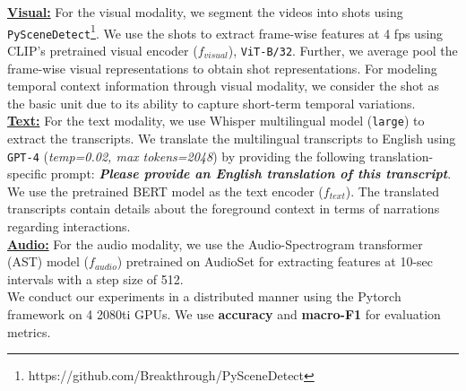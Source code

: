 \textbf{\underline{Visual:}} For the visual modality, we segment the videos into shots using \texttt{PySceneDetect}\footnote{https://github.com/Breakthrough/PySceneDetect}. We use the shots to extract frame-wise features at 4 fps using CLIP's \cite{Radford2021LearningTV} pretrained visual encoder ($f_{visual}$), \texttt{ViT-B/32}. Further, we average pool the frame-wise visual representations to obtain shot representations. For modeling temporal context information through visual modality, we consider the shot as the basic unit due to its ability to capture short-term temporal variations. \\
 \textbf{\underline{Text:}} For the text modality, we use Whisper \cite{Radford2022RobustSR} multilingual model (\texttt{large}) to extract the transcripts.  We translate the multilingual transcripts to English using \texttt{GPT-4} \cite{OpenAI2023GPT4TR} (\textit{temp=0.02, max tokens=2048}) by providing the following translation-specific prompt: \textit{\textbf{Please provide an English translation of this transcript}}. We use the pretrained BERT\cite{Devlin2019BERTPO} model as the text encoder ($f_{text}$). The translated transcripts contain details about the foreground context in terms of narrations regarding interactions.\\
 \textbf{\underline{Audio:}} For the audio modality, we use the Audio-Spectrogram transformer (AST) \cite{gong21b_interspeech} model ($f_{audio}$) pretrained on AudioSet \cite{Gemmeke2017AudioSA} for extracting features at 10-sec intervals with a step size of 512.  \\
 We conduct our experiments in a distributed manner using the Pytorch \cite{Paszke2019PyTorchAI} framework on 4 2080ti GPUs. We use \textbf{accuracy} and \textbf{macro-F1} for evaluation metrics.
